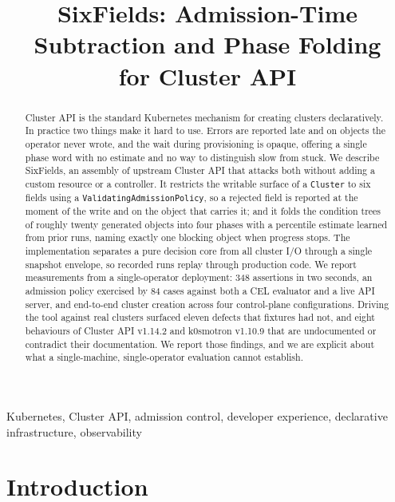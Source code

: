 \documentclass[conference]{IEEEtran}
\begin{document}
\title{SixFields: Admission-Time Subtraction and Phase Folding\\for Cluster API}

\author{
}

\maketitle

\begin{abstract}
Cluster API is the standard Kubernetes mechanism for creating clusters
declaratively. In practice two things make it hard to use. Errors are reported
late and on objects the operator never wrote, and the wait during provisioning is
opaque, offering a single phase word with no estimate and no way to distinguish
slow from stuck. We describe SixFields, an assembly of upstream Cluster API that
attacks both without adding a custom resource or a controller. It restricts the
writable surface of a \texttt{Cluster} to six fields using a
\texttt{ValidatingAdmissionPolicy}, so a rejected field is reported at the moment
of the write and on the object that carries it; and it folds the condition trees
of roughly twenty generated objects into four phases with a percentile estimate
learned from prior runs, naming exactly one blocking object when progress stops.
The implementation separates a pure decision core from all cluster I/O through a
single snapshot envelope, so recorded runs replay through production code. We
report measurements from a single-operator deployment: 348 assertions in two
seconds, an admission policy exercised by 84 cases against both a CEL evaluator
and a live API server, and end-to-end cluster creation across four control-plane
configurations. Driving the tool against real clusters surfaced eleven defects
that fixtures had not, and eight behaviours of Cluster API v1.14.2 and k0smotron
v1.10.9 that are undocumented or contradict their documentation. We report those
findings, and we are explicit about what a single-machine, single-operator
evaluation cannot establish.
\end{abstract}

\begin{IEEEkeywords}
Kubernetes, Cluster API, admission control, developer experience, declarative
infrastructure, observability
\end{IEEEkeywords}

\section{Introduction}
\end{document}
